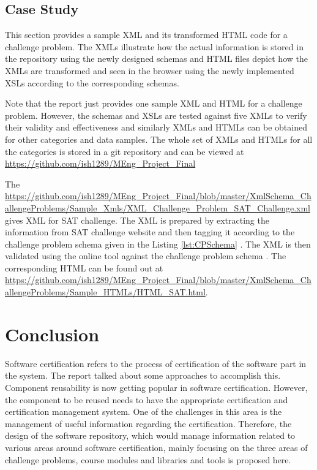 \documentclass[11pt,letterpaper]{report}
\begin{document}
\section{Case Study}
This section provides a sample XML and its transformed HTML code for a challenge problem. The XMLs illustrate how the actual information is stored in the repository using the newly designed schemas and HTML files depict how the XMLs are transformed and seen in the browser using the newly implemented XSLs according to the corresponding schemas. 

Note that the report just provides one sample XML and HTML for a challenge problem. However, the schemas and XSLs are tested against five XMLs to verify their validity and effectiveness and similarly XMLs and HTMLs can be obtained for other categories and data samples. The whole set of XMLs and HTMLs for all the categories is stored in a git repository and can be viewed at \url{https://github.com/ish1289/MEng_Project_Final}

The \url{https://github.com/ish1289/MEng_Project_Final/blob/master/XmlSchema_ChallengeProblems/Sample_Xmls/XML_Challenge_Problem_SAT_Challenge.xml} gives XML for SAT challenge. The XML is prepared by extracting the information from SAT challenge website and then tagging it according to the challenge problem schema given in the Listing \ref{lst:CPSchema} \cite{SAT}. The XML is then validated using the online tool against the challenge problem schema \cite{olXSD}. The corresponding HTML can be found out at \newline \url{https://github.com/ish1289/MEng_Project_Final/blob/master/XmlSchema_ChallengeProblems/Sample_HTMLs/HTML_SAT.html}.

\chapter{Conclusion}
Software certification refers to the process of certification of the software part in the system. The report talked about some approaches to accomplish this. Component reusability is now getting popular in software certification. However, the component to be reused needs to have the appropriate certification and certification management system. One of the challenges in this area is the management of useful information regarding the certification. Therefore, the design of the software repository, which would manage information related to various areas around software certification, mainly focusing on the three areas of challenge problems, course modules and libraries and tools is proposed here.  
\end{document}
